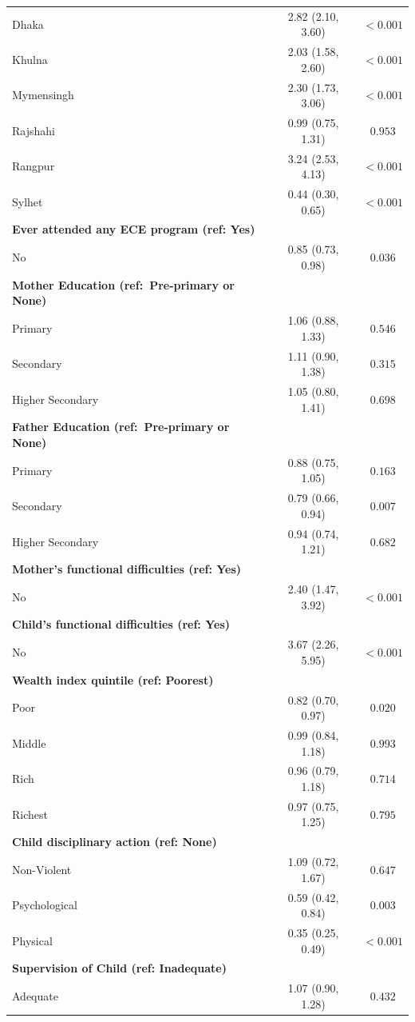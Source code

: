 \documentclass[
  12pt,
  oneside]{report}
\begin{document}
\begin{longtable}{lcc}
Dhaka & 2.82 (2.10, 3.60) & $<0.001$ \\
Khulna & 2.03 (1.58, 2.60) & $<0.001$ \\
Mymensingh & 2.30 (1.73, 3.06) & $<0.001$ \\
Rajshahi & 0.99 (0.75, 1.31) & $0.953$ \\
Rangpur & 3.24 (2.53, 4.13) & $<0.001$ \\
Sylhet & 0.44 (0.30, 0.65) & $<0.001$ \\
\textbf{Ever attended any ECE program (ref: Yes)} & \multicolumn{1}{l}{} & \multicolumn{1}{l}{} \\
No & 0.85 (0.73, 0.98) & $0.036$ \\
\textbf{Mother Education (ref:~Pre-primary or None)} & \multicolumn{1}{l}{} & \multicolumn{1}{l}{} \\
Primary & 1.06 (0.88, 1.33) & $0.546$ \\
Secondary & 1.11 (0.90, 1.38) & $0.315$ \\
Higher Secondary & 1.05 (0.80, 1.41) & $0.698$ \\
\textbf{Father Education (ref:~Pre-primary or None)} & \multicolumn{1}{l}{} & \multicolumn{1}{l}{} \\
Primary & 0.88 (0.75, 1.05) & $0.163$ \\
Secondary & 0.79 (0.66, 0.94) & $0.007$ \\
Higher Secondary & 0.94 (0.74, 1.21) & $0.682$ \\
\textbf{Mother's functional difficulties (ref: Yes)} & \multicolumn{1}{l}{} & \multicolumn{1}{l}{} \\
No & 2.40 (1.47, 3.92) & $<0.001$ \\
\textbf{Child's functional difficulties (ref: Yes)} & \multicolumn{1}{l}{} & \multicolumn{1}{l}{} \\
No & 3.67 (2.26, 5.95) & $<0.001$ \\
\textbf{Wealth index quintile (ref: Poorest)} & \multicolumn{1}{l}{} & \multicolumn{1}{l}{} \\
Poor & 0.82 (0.70, 0.97) & $0.020$ \\
Middle & 0.99 (0.84, 1.18) & $0.993$ \\
Rich & 0.96 (0.79, 1.18) & $0.714$ \\
Richest & 0.97 (0.75, 1.25) & $0.795$ \\
\textbf{Child disciplinary action (ref: None)} & \multicolumn{1}{l}{} & \multicolumn{1}{l}{} \\
Non-Violent & 1.09 (0.72, 1.67) & $0.647$ \\
Psychological & 0.59 (0.42, 0.84) & $0.003$ \\
Physical & 0.35 (0.25, 0.49) & $<0.001$ \\
\textbf{Supervision of Child (ref: Inadequate)} & \multicolumn{1}{l}{} & \multicolumn{1}{l}{} \\
Adequate & 1.07 (0.90, 1.28) & $0.432$ \\
\bottomrule
\end{longtable}
\end{document}

